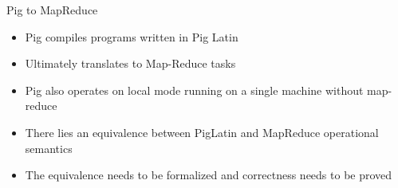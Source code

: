 \begin{frame}{Pig to MapReduce}
\begin{itemize}
	\item Pig compiles programs written in Pig Latin
	\item Ultimately translates to Map-Reduce tasks
	\item Pig also operates on local mode running on a single machine without map-reduce
	\item There lies an equivalence between PigLatin and MapReduce operational semantics
	\item The equivalence needs to be formalized and correctness needs to be proved  
\end{itemize}
\end{frame}